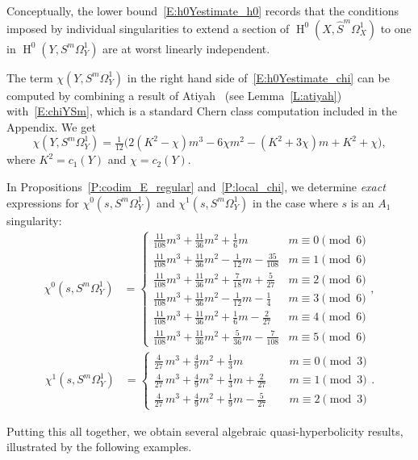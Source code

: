 \documentclass[12pt, reqno]{amsart}
\theoremstyle{definition}
\DeclareMathOperator{\HH}{H}
\numberwithin{equation}{section}
\numberwithin{table}{section}
\begin{document}
Conceptually, the lower bound~\eqref{E:h0Yestimate_h0} records that the conditions imposed by individual singularities to extend a section of $\HH^0(X,\hat S^m\Omega^1_X)$ to one in $\HH^0(Y,S^m\Omega^1_Y)$ are at worst linearly independent.

The term $\chi(Y,S^m\Omega^1_Y)$ in the right hand side of~\eqref{E:h0Yestimate_chi} can be computed by combining a result of Atiyah~\cite{Atiyah1958} (see Lemma~\ref{L:atiyah}) with~\eqref{E:chiYSm}, which is a standard Chern class computation included in the Appendix. We get
\[
\chi(Y,S^m\Omega^1_Y)=\tfrac{1}{12}\big(
2(K^2-\chi)m^3-6\chi m^2-(K^2+3\chi)m+K^2+\chi
\big),
\]
where $K^2 = c_1(Y)$ and $\chi=c_2(Y)$.

In Propositions~\ref{P:codim_E_regular} and~\ref{P:local_chi}, we determine \emph{exact} expressions for $\chi^0(s,S^m\Omega^1_{Y})$ and $\chi^1(s,S^m\Omega^1_{Y})$ in the case where $s$ is an $A_1$ singularity:
\begin{align*}
\chi^0(s,S^m\Omega^1_{Y}) &= 
\begin{cases}
\frac{11}{108}m^3 + \frac{11}{36}m^2 + \frac{1}{6}m & m \equiv 0 \pmod 6 \\
\frac{11}{108}m^3 + \frac{11}{36}m^2 - \frac{1}{12}m - \frac{35}{108} & m \equiv 1 \pmod 6 \\
\frac{11}{108}m^3 + \frac{11}{36}m^2 + \frac{7}{18}m + \frac{5}{27} & m \equiv 2 \pmod 6 \\
\frac{11}{108}m^3 + \frac{11}{36}m^2 - \frac{1}{12}m - \frac{1}{4} & m \equiv 3 \pmod 6 \\
\frac{11}{108}m^3 + \frac{11}{36}m^2 + \frac{1}{6}m - \frac{2}{27} & m \equiv 4 \pmod 6 \\
\frac{11}{108}m^3 + \frac{11}{36}m^2 + \frac{5}{36}m - \frac{7}{108} & m \equiv 5 \pmod 6 
\end{cases},
\end{align*}
\begin{align*}
\chi^1(s,S^m\Omega^1_{Y}) &=
\begin{cases}
{\frac {4}{27}}\,{m}^{3}+\frac{4}{9}{m}^{2}+\frac{1}{3}m & \quad\  m\equiv 0\pmod{3}\\
{\frac {4}{27}}\,{m}^{3}+\frac{4}{9}{m}^{2}+\frac{1}{3}m+{\frac{2}{27}}& \quad\ m\equiv 1\pmod{3}\\
{\frac {4}{27}}\,{m}^{3}+\frac{4}{9}{m}^{2}+\frac{1}{9}m-{\frac{5}{27}}& \quad\ m\equiv 2\pmod{3}
\end{cases}.
\end{align*} 

Putting this all together, we obtain several algebraic quasi-hyperbolicity results, illustrated by the following examples.
\end{document}
